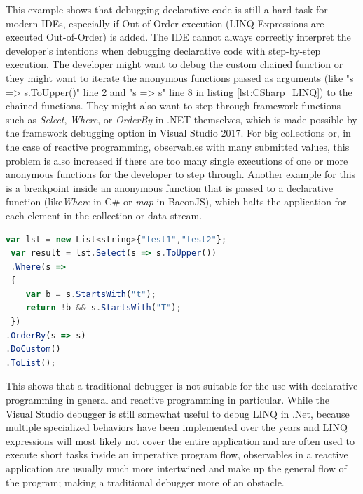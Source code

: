 This example shows that debugging declarative code is still a hard task for modern IDEs, especially if Out-of-Order execution (LINQ Expressions are executed Out-of-Order) is added. The IDE cannot always correctly interpret the developer's intentions when debugging declarative code with step-by-step execution. The developer might want to debug the custom chained function or they might want to iterate the anonymous functions passed as arguments (like "s => s.ToUpper()" line 2 and "s => s" line 8 in listing \ref{lst:CSharp_LINQ}) to the chained functions. They might also want to step through framework functions such as \emph{Select}, \emph{Where}, or \emph{OrderBy} in .NET themselves, which is made possible by the framework debugging option in Visual Studio 2017.
For big collections or, in the case of reactive programming, observables with many submitted values, this problem is also increased if there are too many single executions of one or more anonymous functions for the developer to step through. Another example for this is a breakpoint inside an anonymous function that is passed to a declarative function (like\emph{Where} in C\# or \emph{map} in BaconJS), which halts the application for each element in the collection or data stream.

\begin{lstlisting}[language=JavaScript, caption={Simple example of .NET LINQ in C\# to show the steps the Visual Studio 2017 for .NET debugger takes while debugging step-by-step.},label={lst:CSharp_LINQ}]
 var lst = new List<string>{"test1","test2"};
 var result = lst.Select(s => s.ToUpper())
 .Where(s =>
 {
	var b = s.StartsWith("t");
	return !b && s.StartsWith("T");
 })
.OrderBy(s => s)
.DoCustom()
.ToList();
\end{lstlisting}

This shows that a traditional debugger is not suitable for the use with declarative programming in general and reactive programming in particular. While the Visual Studio debugger is still somewhat useful to debug LINQ in .Net, because multiple specialized behaviors have been implemented over the years and LINQ expressions will most likely not cover the entire application and are often used to execute short tasks inside an imperative program flow, observables in a reactive application are usually much more intertwined and make up the general flow of the program; making a traditional debugger more of an obstacle.

